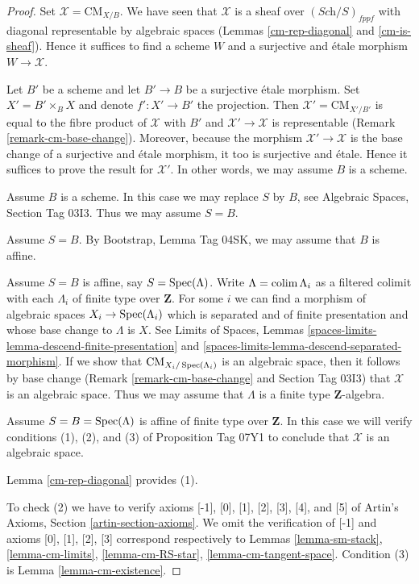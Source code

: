 \documentclass{stacks-project}
\theoremstyle{plain}
\theoremstyle{definition}
\DeclareMathOperator{\Spec}{Spec}
\theoremstyle{remark}
\numberwithin{equation}{subsection}
\def\colim{\mathop{\rm colim}\nolimits}
\def\Spec{\mathop{\rm Spec}}
\def\Sch{\textit{Sch}}
\def\CMfunctor{\mathcal{C}\!{\it oh}}
\def\CMfunctor{\text{CM}}
\begin{document}
\begin{proof}
Set $\mathcal{X} = \CMfunctor_{X/B}$. We have seen that $\mathcal{X}$
is a sheaf over $(\Sch/S)_{fppf}$ with diagonal representable
by algebraic spaces
(Lemmas \ref{cm-rep-diagonal} and \ref{cm-is-sheaf}).
Hence it suffices to find a scheme $W$ and a surjective and \'etale
morphism $W \to \mathcal{X}$.

\medskip\noindent
Let $B'$ be a scheme and let $B' \to B$ be a surjective \'etale morphism.
Set $X' = B' \times_B X$ and denote $f' : X' \to B'$ the projection.
Then $\mathcal{X}' = \CMfunctor_{X'/B'}$ is equal to the fibre
product of $\mathcal{X}$ with $B'$ and $\mathcal{X}'\rightarrow\mathcal{X}$ is representable
(Remark \ref{remark-cm-base-change}). 
Moreover, because the morphism $\mathcal{X}' \to \mathcal{X}$ is the base change of a surjective and \'etale morphism, it too is surjective and \'etale.
Hence it suffices to prove the result for $\mathcal{X}'$.
In other words, we may assume $B$ is a scheme.

\medskip\noindent
Assume $B$ is a scheme. In this case we may replace $S$ by $B$, see
Algebraic Spaces, Section Tag 03I3.
Thus we may assume $S = B$.

\medskip\noindent
Assume $S = B$.
By Bootstrap, Lemma Tag 04SK, we may assume that $B$ is affine.

\medskip\noindent
Assume $S = B$ is affine, say $S = \Spec(\Lambda)$.
Write $\Lambda = \colim \Lambda_i$ as a filtered colimit with each $\Lambda_i$
of finite type over $\mathbf{Z}$. For some $i$ we can find
a morphism of algebraic spaces $X_i \to \Spec(\Lambda_i)$
which is separated and of finite presentation and whose base change
to $\Lambda$ is $X$. See Limits of Spaces, Lemmas
\ref{spaces-limits-lemma-descend-finite-presentation} and
\ref{spaces-limits-lemma-descend-separated-morphism}.
If we show that $\CMfunctor_{X_i/\Spec(\Lambda_i)}$ is an
algebraic space, then it follows by base change
(Remark \ref{remark-cm-base-change} and Section Tag 03I3)
that $\mathcal{X}$ is an algebraic space.
Thus we may assume that $\Lambda$ is a finite type $\mathbf{Z}$-algebra.

\medskip\noindent
Assume $S = B = \Spec(\Lambda)$ is affine of finite type over $\mathbf{Z}$.
In this case we will verify conditions (1), (2), and (3) of 
Proposition Tag 07Y1
to conclude that $\mathcal{X}$ is an algebraic space.

\medskip\noindent
Lemma \ref{cm-rep-diagonal} provides (1).

\medskip\noindent
To check (2) we have to verify axioms [-1], [0], [1], [2], [3], [4], and [5]
of Artin's Axioms, Section \ref{artin-section-axioms}.
We omit the verification of [-1] and axioms
[0], [1], [2], [3] correspond respectively to
Lemmas \ref{lemma-sm-stack},
\ref{lemma-cm-limits},
\ref{lemma-cm-RS-star},
\ref{lemma-cm-tangent-space}.
Condition (3) is Lemma \ref{lemma-cm-existence}.


\end{proof}
\end{document}
